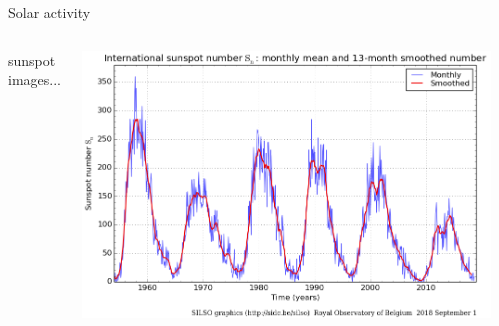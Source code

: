 \begin{frame}[plain,c]{Solar activity}{}
	\begin{columns}[c]
		
		sunspot images...
		
		
		\includegraphics[width=\textwidth]{../figures_of_others/images/ROB_SILSO_SSN_wolfmms_cropped.png}

		\vfill\hfill \hyperlink{butterfly}{}
		
	\end{columns}
\end{frame}
